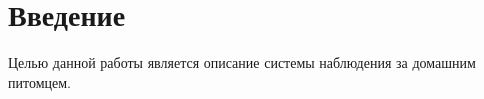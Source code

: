 \section*{Введение}

Целью данной работы является описание системы наблюдения за домашним питомцем.

